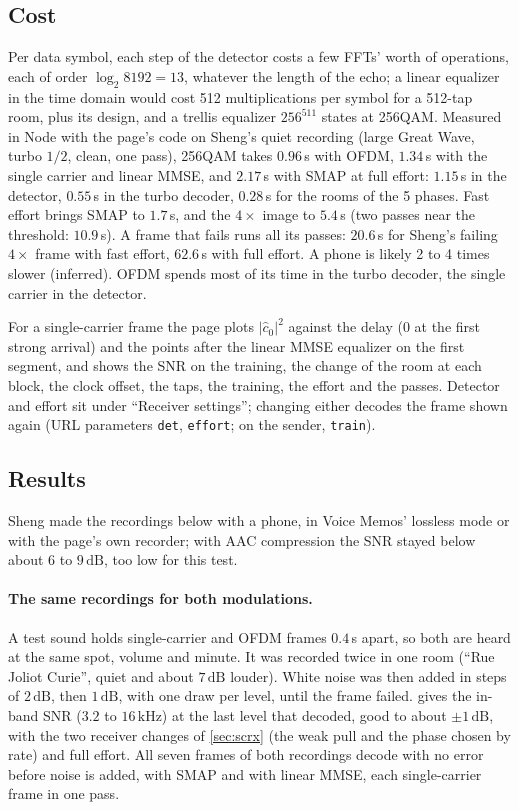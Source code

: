 \documentclass[11pt,a4paper]{article}
\newcommand{\kHz}{\,\mathrm{kHz}}
\newcommand{\dB}{\,\mathrm{dB}}
\newcommand{\code}[1]{\texttt{#1}}
\theoremstyle{remark}
\begin{document}
\subsection{Cost}
Per data symbol, each step of the detector costs a few FFTs' worth of operations, each of order $\log_2 8192 = 13$, whatever the length of the echo; a linear equalizer in the time domain would cost 512 multiplications per symbol for a 512-tap room, plus its design, and a trellis equalizer $256^{511}$ states at 256QAM. Measured in Node with the page's code on Sheng's quiet recording (large Great Wave, turbo $1/2$, clean, one pass), 256QAM takes $0.96$\,s with OFDM, $1.34$\,s with the single carrier and linear MMSE, and $2.17$\,s with SMAP at full effort: $1.15$\,s in the detector, $0.55$\,s in the turbo decoder, $0.28$\,s for the rooms of the 5 phases. Fast effort brings SMAP to $1.7$\,s, and the $4\times$ image to $5.4$\,s (two passes near the threshold: $10.9$\,s). A frame that fails runs all its passes: $20.6$\,s for Sheng's failing $4\times$ frame with fast effort, $62.6$\,s with full effort. A phone is likely 2 to 4 times slower (inferred). OFDM spends most of its time in the turbo decoder, the single carrier in the detector.

For a single-carrier frame the page plots $|\hat c_0|^2$ against the delay (0 at the first strong arrival) and the points after the linear MMSE equalizer on the first segment, and shows the SNR on the training, the change of the room at each block, the clock offset, the taps, the training, the effort and the passes. Detector and effort sit under ``Receiver settings''; changing either decodes the frame shown again (URL parameters \code{det}, \code{effort}; on the sender, \code{train}).

\subsection{Results}
\label{sec:scres}
Sheng made the recordings below with a phone, in Voice Memos' lossless mode or with the page's own recorder; with AAC compression the SNR stayed below about 6 to $9\dB$, too low for this test.

\paragraph{The same recordings for both modulations.}
A test sound holds single-carrier and OFDM frames $0.4$\,s apart, so both are heard at the same spot, volume and minute. It was recorded twice in one room (``Rue Joliot Curie'', quiet and about $7\dB$ louder). White noise was then added in steps of $2\dB$, then $1\dB$, with one draw per level, until the frame failed.  gives the in-band SNR ($3.2$ to $16\kHz$) at the last level that decoded, good to about $\pm 1\dB$, with the two receiver changes of \cref{sec:scrx} (the weak pull and the phase chosen by rate) and full effort. All seven frames of both recordings decode with no error before noise is added, with SMAP and with linear MMSE, each single-carrier frame in one pass.
\end{document}
